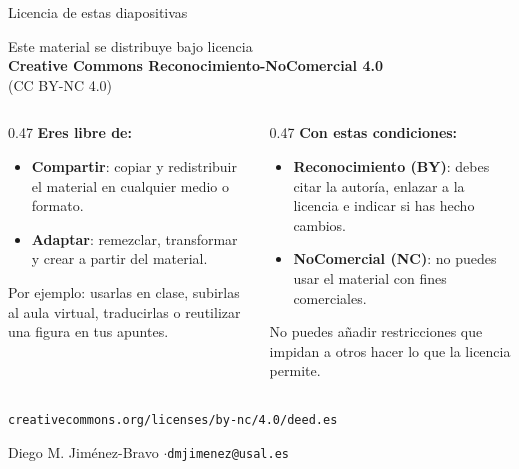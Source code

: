 \documentclass[aspectratio=169]{beamer}
\makeatletter
\newcommand{\titleslide}{%
\begin{frame}
  \titlepage
  \vspace{-0.5em}
  {\footnotesize Diego M. Jiménez-Bravo \quad$\cdot$\quad \texttt{dmjimenez@usal.es}}
\end{frame}
}
\makeatother
\begin{document}
\begin{frame}{Licencia de estas diapositivas}
  \begin{center}
    Este material se distribuye bajo licencia\\[0.3em]
    {\large\textbf{\textcolor{usalred}{Creative Commons Reconocimiento-NoComercial 4.0}}}\\[0.2em]
    {\footnotesize (CC BY-NC 4.0)}
  \end{center}
  \vspace{0.3em}
  \small
  \begin{columns}[t]
    \begin{column}{0.47\textwidth}
      \textbf{\textcolor{usalred}{Eres libre de:}}
      \begin{itemize}
        \item \textbf{Compartir}: copiar y redistribuir el material en cualquier medio o formato.
        \item \textbf{Adaptar}: remezclar, transformar y crear a partir del material.
      \end{itemize}
      {\footnotesize Por ejemplo: usarlas en clase, subirlas al aula virtual, traducirlas o reutilizar una figura en tus apuntes.}
    \end{column}
    \begin{column}{0.47\textwidth}
      \textbf{\textcolor{usalred}{Con estas condiciones:}}
      \begin{itemize}
        \item \textbf{Reconocimiento (BY)}: debes citar la autoría, enlazar a la licencia e indicar si has hecho cambios.
        \item \textbf{NoComercial (NC)}: no puedes usar el material con fines comerciales.
      \end{itemize}
      {\footnotesize No puedes añadir restricciones que impidan a otros hacer lo que la licencia permite.}
    \end{column}
  \end{columns}
  \vspace{0.4em}
  \begin{center}
    {\footnotesize\texttt{creativecommons.org/licenses/by-nc/4.0/deed.es}}
  \end{center}
\end{frame}

\titleslide
\end{document}
